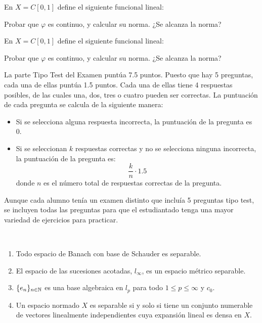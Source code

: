 \documentclass[12pt]{article}
\begin{document}
\begin{ejercicio}[2.5 puntos]
    En $X=C[0,1]$ define el siguiente funcional lineal:

    Probar que $\varphi$ es continuo, y calcular su norma. ¿Se alcanza la norma?
\end{ejercicio}

\begin{ejercicio}[2.5 puntos]
    En $X=C[0,1]$ define el siguiente funcional lineal:

    Probar que $\varphi$ es continuo, y calcular su norma. ¿Se alcanza la norma?
\end{ejercicio}

\vspace{1cm}

La parte Tipo Test del Examen puntúa 7.5 puntos. Puesto que hay 5 preguntas, cada una de ellas puntúa 1.5 puntos. Cada una de ellas tiene 4 respuestas posibles, de las cuales una, dos, tres o cuatro pueden ser correctas. La puntuación de cada pregunta se calcula de la siguiente manera:
\begin{itemize}
    \item Si se selecciona alguna respuesta incorrecta, la puntuación de la pregunta es 0.
    \item Si se seleccionan $k$ respuestas correctas y no se selecciona ninguna incorrecta, la puntuación de la pregunta es:
    \begin{equation*}
        \frac{k}{n} \cdot 1.5
    \end{equation*}
    donde $n$ es el número total de respuestas correctas de la pregunta.
\end{itemize}


Aunque cada alumno tenía un examen distinto que incluía 5 preguntas tipo test, se incluyen todas las preguntas para que el estudiantado tenga una mayor variedad de ejercicios para practicar.
\begin{ejercicio}~
    \begin{enumerate}[label=(\alph*)]
        \item Todo espacio de Banach con base de Schauder es separable.
        \item El espacio de las sucesiones acotadas, $l_\infty$, es un espacio métrico separable.
        \item $\{e_n\}_{n\in \mathbb{N}}$ es una base algebraica en $l_p$ para todo $1\leq p \leq \infty$ y $c_0$.
        \item Un espacio normado $X$ es separable si y solo si tiene un conjunto numerable de vectores linealmente independientes cuya expansión lineal es densa en $X$.
    \end{enumerate}    
\end{ejercicio}
\end{document}
